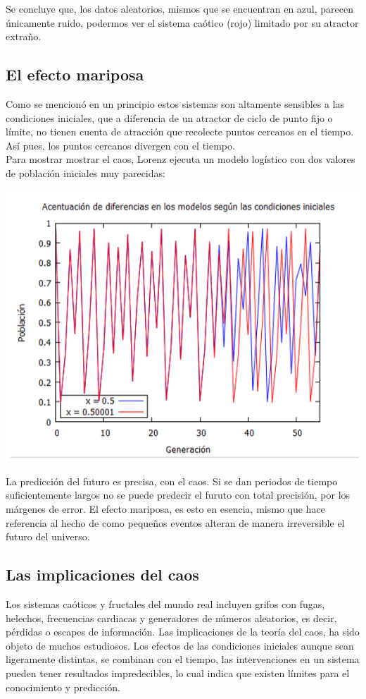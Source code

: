 \documentclass{article}
\begin{document}
Se concluye que, los datos aleatorios, mismos que se encuentran en azul, parecen únicamente ruido, podermos ver el sistema caótico (rojo) limitado por su atractor extraño.

\subsection{El efecto mariposa}
Como se mencionó en un principio estos sistemas son altamente sensibles a las condiciones iniciales, que a diferencia de un atractor de ciclo de punto fijo o límite, no tienen cuenta de atracción que recolecte puntos cercanos en el tiempo. Así pues, los puntos cercanos divergen con el tiempo. \\
Para mostrar mostrar el caos, Lorenz ejecuta un modelo logístico con dos valores de población iniciales muy parecidas:

\begin{center}
\includegraphics[scale=0.1]{Act112.PNG}
\end{center}

La predicción del futuro es precisa, con el caos. Si se dan periodos de tiempo suficientemente largos no se puede predecir el furuto con total precisión, por los márgenes de error. El efecto mariposa, es esto en esencia, mismo que hace referencia al hecho de como pequeños eventos alteran de manera irreversible el futuro del universo.

\subsection{Las implicaciones del caos}
Los sistemas caóticos y fructales del mundo real incluyen grifos con fugas, helechos, frecuencias cardiacas y generadores de números aleatorios, es decir, pérdidas o escapes de información. Las implicaciones de la teoría del caos, ha sido objeto de muchos estudiosos. Los efectos de las condiciones iniciales aunque sean ligeramente distintas, se combinan con el tiempo, las intervenciones en un sistema pueden tener resultados impredecibles, lo cual indica que existen límites para el conocimiento y predicción.
\end{document}
